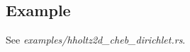 \documentclass[10pt,a4paper]{article}
\begin{document}
\subsection*{Example}
See \textit{examples/hholtz2d\_cheb\_dirichlet.rs}.
%
%
%
%
%
%
\end{document}
